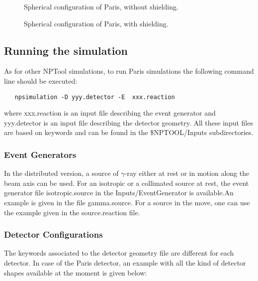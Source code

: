 \documentclass[a4paper,12pt]{article}
\begin{document}
\begin{figure*}[ht]
\begin{center}
\end{center}
\caption{Spherical configuration of Paris, without shielding.} 
\label{fig:Paris1}
\end{figure*}

\begin{figure*}[ht]
\begin{center}
\end{center}
\caption{Spherical configuration of Paris, with shielding.} 
\label{fig:Paris2}
\end{figure*}

\subsection{Running the simulation}
As for other NPTool simulations, to run Paris simulations the following command line should 
be executed: 

\begin{verbatim}
   npsimulation -D yyy.detector -E  xxx.reaction
\end{verbatim}

where xxx.reaction is an input file describing the event generator and
yyy.detector is an input file describing the detector geometry. All these
input files are based on keywords and can be found in the 
\$NPTOOL/Inputs subdirectories.

\subsubsection{Event Generators}
In the distributed version, a source of $\gamma$-ray either at rest or in motion along the 
beam axis can be used. For an isotropic or a collimated source at rest, the event generator 
file isotropic.source in the Inputs/EventGenerator is available.An example is given in the 
file gamma.source. For a source in the move, one can use the example given in the 
source.reaction file.  

\subsubsection{Detector Configurations}
The keywords associated to the detector geometry file are different for 
each detector. In case of the Paris detector, an example with 
all the kind of detector shapes available at the moment is given below:
\end{document}
